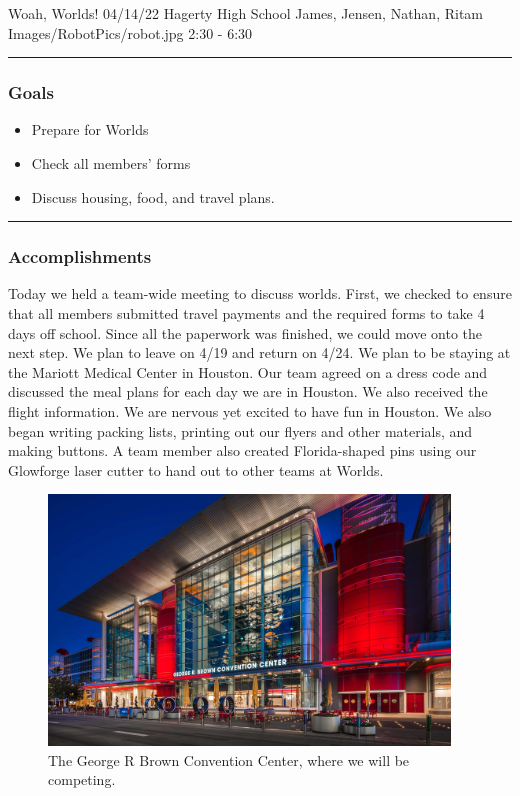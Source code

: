 \insertmeeting 
	{Woah, Worlds!} 
	{04/14/22} 
	{Hagerty High School}
	{James, Jensen, Nathan, Ritam}
	{Images/RobotPics/robot.jpg}
	{2:30 - 6:30}
	
\noindent\hfil\rule{\textwidth}{.4pt}\hfil
\subsubsection*{Goals}
\begin{itemize}
    \item Prepare for Worlds
    \item Check all members' forms
    \item Discuss housing, food, and travel plans.

\end{itemize} 

\noindent\hfil\rule{\textwidth}{.4pt}\hfil

\subsubsection*{Accomplishments}
Today we held a team-wide meeting to discuss worlds. First, we checked to ensure that all members submitted travel payments and the required forms to take 4 days off school. Since all the paperwork was finished, we could move onto the next step. We plan to leave on 4/19 and return on 4/24. We plan to be staying at the Mariott Medical Center in Houston. Our team agreed on a dress code and discussed the meal plans for each day we are in Houston. We also received the flight information. We are nervous yet excited to have fun in Houston. We also began writing packing lists, printing out our flyers and other materials, and making buttons. A team member also created Florida-shaped pins using our Glowforge laser cutter to hand out to other teams at Worlds. 

\begin{figure}[htp]
\centering
\includegraphics[width=0.95\textwidth, angle=0]{Meetings/April/04-14-22/04-14-22 1.JPG}
\caption{The George R Brown Convention Center, where we will be competing.}
\label{fig:041422_1}
\end{figure}

